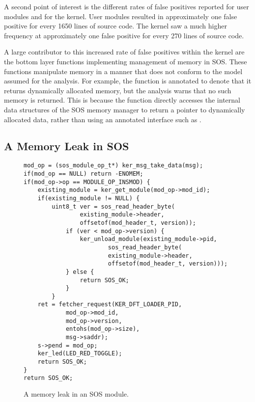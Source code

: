 A second point of interest is the different rates of false positives
reported for user modules and for the kernel.  User modules resulted
in approximately one false positive for every 1650 lines of source
code.  The kernel saw a much higher frequency at approximately one 
false positive for every 270 lines of source code.  

A large contributor to this increased rate of false positives within
the kernel are the bottom layer functions implementing management of
memory in SOS.  These functions manipulate memory in a manner that
does not conform to the model assumed for the analysis.  For example,
the function  is annotated to denote that
it returns dynamically allocated memory, but the analysis warns that
no such memory is returned.  This is because the function directly
accesses the internal data structures of the SOS memory manager to
return a pointer to dynamically allocated data, rather than using an
annotated interface such as .


%
% 

\subsection{A Memory Leak in SOS}
\label{ss:tale}

\begin{figure}[tp]
\begin{scriptsize}
\begin{verbatim}
mod_op = (sos_module_op_t*) ker_msg_take_data(msg);
if(mod_op == NULL) return -ENOMEM;
if(mod_op->op == MODULE_OP_INSMOD) {
    existing_module = ker_get_module(mod_op->mod_id);
    if(existing_module != NULL) {
        uint8_t ver = sos_read_header_byte(
                existing_module->header,
                offsetof(mod_header_t, version));
            if (ver < mod_op->version) {
                ker_unload_module(existing_module->pid, 
                        sos_read_header_byte(
                        existing_module->header,
                        offsetof(mod_header_t, version)));
            } else {
                return SOS_OK;
            }
        }
    ret = fetcher_request(KER_DFT_LOADER_PID,
            mod_op->mod_id,
            mod_op->version,
            entohs(mod_op->size),
            msg->saddr);
    s->pend = mod_op;
    ker_led(LED_RED_TOGGLE);
    return SOS_OK;
}
return SOS_OK;
\end{verbatim}
\end{scriptsize}
\label{fig:leak}
\caption{A memory leak in an SOS module.}
\end{figure}

